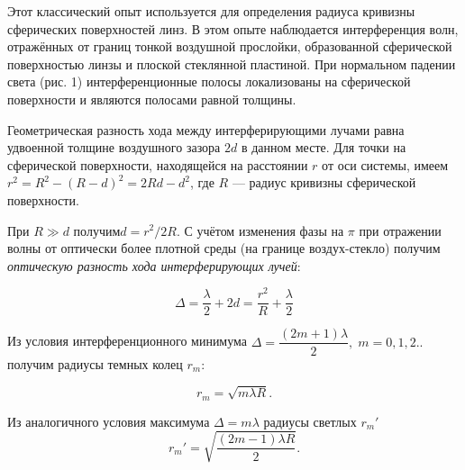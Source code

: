 \documentclass[a4paper, 12pt]{article}
\begin{document}
Этот классический опыт используется для определения радиуса кривизны сферических поверхностей линз. В этом опыте наблюдается интерференция волн, отражённых от границ тонкой воздушной прослойки, образованной сферической поверхностью линзы и плоской стеклянной пластиной. При нормальном падении света (рис. 1) интерференционные полосы локализованы на сферической поверхности и являются полосами равной толщины.
	
Геометрическая разность хода между интерферирующими лучами равна удвоенной толщине воздушного зазора $ 2d $ в данном месте. Для точки на сферической поверхности, находящейся на расстоянии $ r $ от оси системы, имеем $ r^2 = R^2 - (R - d)^2 = 2Rd - d^2 $, где $ R $ --- радиус кривизны сферической поверхности.
	
При $ R \gg d $ получим$  d = r^2/2R $. С учётом изменения фазы на $ \pi $ при отражении волны от оптически более плотной среды (на границе воздух-стекло) получим \textit{оптическую разность хода интерферирующих лучей}:
	
\begin{equation}\label{r_m}
\Delta = \dfrac{\lambda}{2} + 2d = \dfrac{r^2}{R} + \dfrac{\lambda}{2}
\end{equation}
	
Из условия интерференционного минимума $ \Delta = \dfrac{(2m +1)\lambda}{2}, \; m =0, 1, 2.. $ получим радиусы темных колец $ r_m $:
	
\begin{equation}\label{r_m'}
r_m = \sqrt{m \lambda R}.
\end{equation}

Из аналогичного условия максимума $ \Delta = m \lambda $ радиусы светлых $ r_m' $ 
\begin{equation}\label{r_m'}
r_m' = \sqrt{\dfrac{(2m-1) \lambda R}{2}}.
\end{equation}
\newpage
\end{document}
